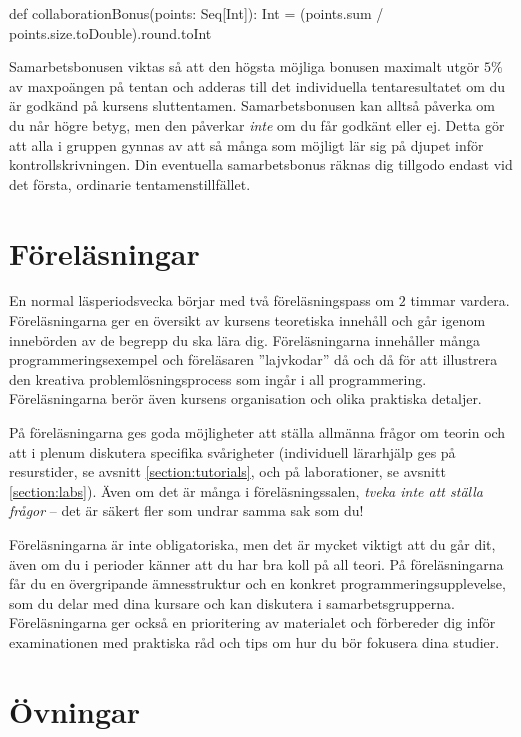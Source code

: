 \begin{Code}
  def collaborationBonus(points: Seq[Int]): Int =
    (points.sum / points.size.toDouble).round.toInt
\end{Code}

Samarbetsbonusen viktas så att den högsta möjliga bonusen maximalt utgör $5\%$ av maxpoängen på tentan och adderas till det individuella tentaresultatet om du är godkänd på kursens sluttentamen. Samarbetsbonusen kan alltså påverka om du når högre betyg, men den påverkar \emph{inte} om du får godkänt eller ej. Detta gör att alla i gruppen gynnas av att så många som möjligt lär sig på djupet inför kontrollskrivningen. Din eventuella samarbetsbonus räknas dig tillgodo endast vid det första, ordinarie tentamenstillfället.

\section{Föreläsningar}

En normal läsperiodsvecka börjar med två föreläsningspass om $2$ timmar vardera. Föreläsningarna ger en översikt av kursens teoretiska innehåll och går igenom innebörden av de begrepp du ska lära dig. Föreläsningarna innehåller många programmeringsexempel och föreläsaren ''lajvkodar'' då och då för att illustrera den kreativa problemlösningsprocess som ingår i all programmering. Föreläsningarna berör även kursens organisation och olika praktiska detaljer.

På föreläsningarna ges goda möjligheter att ställa allmänna frågor om teorin och att i plenum diskutera specifika svårigheter (individuell lärarhjälp ges på resurstider, se avsnitt \ref{section:tutorials}, och på laborationer, se avsnitt \ref{section:labs}). Även om det är många i föreläsningssalen, \emph{tveka inte att ställa frågor} -- det är säkert fler som undrar samma sak som du!

Föreläsningarna är inte obligatoriska, men det är mycket viktigt att du går dit, även om du i perioder känner att du har bra koll på all teori. På föreläsningarna får du en övergripande ämnesstruktur och en konkret programmeringsupplevelse, som du delar med dina kursare och kan diskutera i samarbetsgrupperna. Föreläsningarna ger också en prioritering av materialet och förbereder dig inför examinationen med praktiska råd och tips om hur du bör fokusera dina studier.

\section{Övningar}

